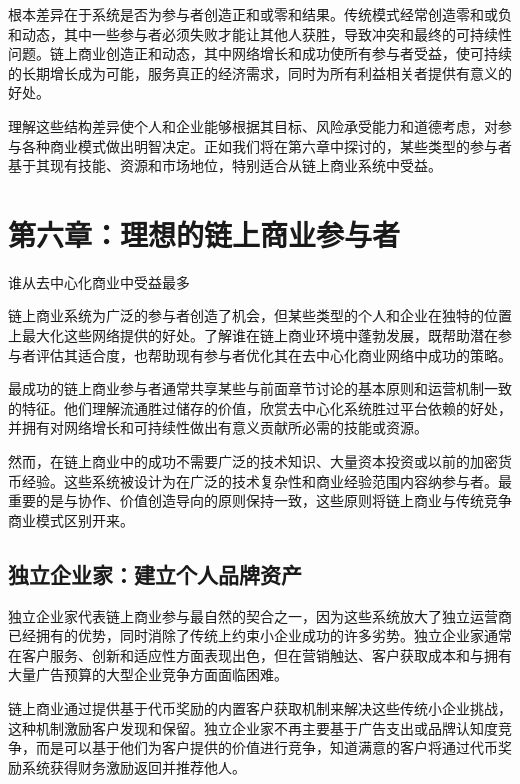 \documentclass[
  Letterpaper,
]{scrbook}
\begin{document}
根本差异在于系统是否为参与者创造正和或零和结果。传统模式经常创造零和或负和动态，其中一些参与者必须失败才能让其他人获胜，导致冲突和最终的可持续性问题。链上商业创造正和动态，其中网络增长和成功使所有参与者受益，使可持续的长期增长成为可能，服务真正的经济需求，同时为所有利益相关者提供有意义的好处。

理解这些结构差异使个人和企业能够根据其目标、风险承受能力和道德考虑，对参与各种商业模式做出明智决定。正如我们将在第六章中探讨的，某些类型的参与者基于其现有技能、资源和市场地位，特别适合从链上商业系统中受益。

\chapter{第六章：理想的链上商业参与者}\label{sec-ideal-participants}

谁从去中心化商业中受益最多

链上商业系统为广泛的参与者创造了机会，但某些类型的个人和企业在独特的位置上最大化这些网络提供的好处。了解谁在链上商业环境中蓬勃发展，既帮助潜在参与者评估其适合度，也帮助现有参与者优化其在去中心化商业网络中成功的策略。

最成功的链上商业参与者通常共享某些与前面章节讨论的基本原则和运营机制一致的特征。他们理解流通胜过储存的价值，欣赏去中心化系统胜过平台依赖的好处，并拥有对网络增长和可持续性做出有意义贡献所必需的技能或资源。

然而，在链上商业中的成功不需要广泛的技术知识、大量资本投资或以前的加密货币经验。这些系统被设计为在广泛的技术复杂性和商业经验范围内容纳参与者。最重要的是与协作、价值创造导向的原则保持一致，这些原则将链上商业与传统竞争商业模式区别开来。

\section{独立企业家：建立个人品牌资产}\label{ux72ecux7acbux4f01ux4e1aux5bb6ux5efaux7acbux4e2aux4ebaux54c1ux724cux8d44ux4ea7}

独立企业家代表链上商业参与最自然的契合之一，因为这些系统放大了独立运营商已经拥有的优势，同时消除了传统上约束小企业成功的许多劣势。独立企业家通常在客户服务、创新和适应性方面表现出色，但在营销触达、客户获取成本和与拥有大量广告预算的大型企业竞争方面面临困难。

链上商业通过提供基于代币奖励的内置客户获取机制来解决这些传统小企业挑战，这种机制激励客户发现和保留。独立企业家不再主要基于广告支出或品牌认知度竞争，而是可以基于他们为客户提供的价值进行竞争，知道满意的客户将通过代币奖励系统获得财务激励返回并推荐他人。
\end{document}
